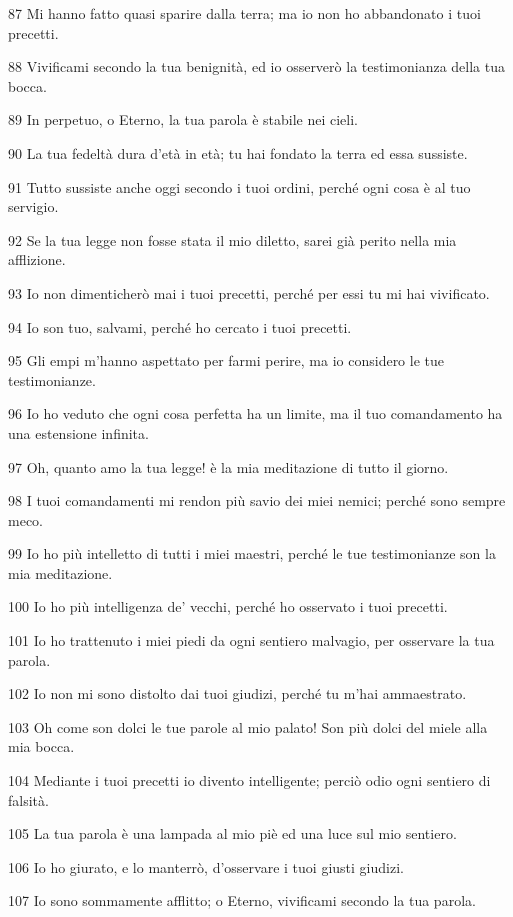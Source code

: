 \par 87 Mi hanno fatto quasi sparire dalla terra; ma io non ho abbandonato i tuoi precetti.
\par 88 Vivificami secondo la tua benignità, ed io osserverò la testimonianza della tua bocca.
\par 89 In perpetuo, o Eterno, la tua parola è stabile nei cieli.
\par 90 La tua fedeltà dura d'età in età; tu hai fondato la terra ed essa sussiste.
\par 91 Tutto sussiste anche oggi secondo i tuoi ordini, perché ogni cosa è al tuo servigio.
\par 92 Se la tua legge non fosse stata il mio diletto, sarei già perito nella mia afflizione.
\par 93 Io non dimenticherò mai i tuoi precetti, perché per essi tu mi hai vivificato.
\par 94 Io son tuo, salvami, perché ho cercato i tuoi precetti.
\par 95 Gli empi m'hanno aspettato per farmi perire, ma io considero le tue testimonianze.
\par 96 Io ho veduto che ogni cosa perfetta ha un limite, ma il tuo comandamento ha una estensione infinita.
\par 97 Oh, quanto amo la tua legge! è la mia meditazione di tutto il giorno.
\par 98 I tuoi comandamenti mi rendon più savio dei miei nemici; perché sono sempre meco.
\par 99 Io ho più intelletto di tutti i miei maestri, perché le tue testimonianze son la mia meditazione.
\par 100 Io ho più intelligenza de' vecchi, perché ho osservato i tuoi precetti.
\par 101 Io ho trattenuto i miei piedi da ogni sentiero malvagio, per osservare la tua parola.
\par 102 Io non mi sono distolto dai tuoi giudizi, perché tu m'hai ammaestrato.
\par 103 Oh come son dolci le tue parole al mio palato! Son più dolci del miele alla mia bocca.
\par 104 Mediante i tuoi precetti io divento intelligente; perciò odio ogni sentiero di falsità.
\par 105 La tua parola è una lampada al mio piè ed una luce sul mio sentiero.
\par 106 Io ho giurato, e lo manterrò, d'osservare i tuoi giusti giudizi.
\par 107 Io sono sommamente afflitto; o Eterno, vivificami secondo la tua parola.

